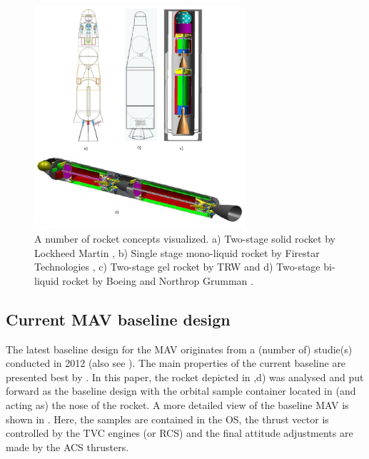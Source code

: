 \begin{figure}[!ht]
\centering
\includegraphics[width=0.7\textwidth]{figures/launcher_methods/diff_mav_trinidad2012_stephenson2002_mungas2012.jpg}
\caption{A number of rocket concepts visualized. a) Two-stage solid rocket by Lockheed Martin \cite{stephenson2002}, b) Single stage mono-liquid rocket by Firestar Technologies \cite{mungas2012}, c) Two-stage gel rocket by \ac{TRW} \cite{stephenson2002} and d) Two-stage bi-liquid rocket by Boeing and Northrop Grumman \cite{trinidad2012}.}
\label{fig:diff_mav_trinidad2012_stephenson2002_mungas2012}
\end{figure}

\subsection{Current \ac{MAV} baseline design}
\label{subsec:cur_mav_bas}
The latest baseline design for the \ac{MAV} originates from a (number of) studie(s) conducted in 2012 (also see ). The main properties of the current baseline are presented best by \cite{trinidad2012}. In this paper, the rocket depicted in ,d) was analysed and put forward as the baseline design with the orbital sample container located in (and acting as) the nose of the rocket. A more detailed view of the baseline \ac{MAV} is shown in . Here, the samples are contained in the \ac{OS}, the thrust vector is controlled by the \ac{TVC} engines (or \ac{RCS}) and the final attitude adjustments are made by the \ac{ACS} thrusters.

